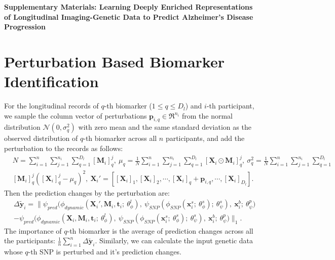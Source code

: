 \clearpage
\clearpage
\begin{center}
    \textbf{\Large Supplementary Materials: Learning Deeply Enriched Representations of Longitudinal Imaging-Genetic Data to Predict Alzheimer's Disease Progression}
\end{center}
\beginsupplement

\section{Perturbation Based Biomarker Identification}
For the longitudinal records of $q$-th biomarker ($1 \leq q \leq D_l$) and $i$-th participant, we sample the column vector of perturbations $\mathbf{p}_{i,q} \in \Re^{n_i}$ from the normal distribution $\mathcal{N}(0, \sigma_q^2)$ with zero mean and the same standard deviation as the observed distribution of $q$-th biomarker across all $n$ participants, and add the perturbation to the records as follows:
\begin{equation}
\begin{aligned}
    &N = \sum_{i=1}^n \sum_{j=1}^{n_i} \sum_{q=1}^{D_l} [\mathbf{M}_i]^j_q,\ \mu_q = \frac{1}{N}\sum_{i=1}^n \sum_{j=1}^{n_i} \sum_{q=1}^{D_l} [\mathbf{X}_i \odot \mathbf{M}_i]^j_q,\ \sigma_q^2 = \frac{1}{N}\sum_{i=1}^n \sum_{j=1}^{n_i} \sum_{q=1}^{D_l}\\
    &[\mathbf{M}_i]^j_q ([\mathbf{X}_i]^j_q - \mu_q)^2,\ \mathbf{X}_i' = [[\mathbf{X}_i]_1, [\mathbf{X}_i]_2, \cdots, [\mathbf{X}_i]_q + \mathbf{p}_{i, q}, \cdots, [\mathbf{X}_i]_{D_l}].
\end{aligned}
\end{equation}
Then the prediction changes by the perturbation are:
\begin{equation}\label{eq: neuroimaging identification}
\begin{aligned}
    &\Delta\tilde{\mathbf{y}}_i = \| \psi_{pred}\bigl(\phi_{dynamic}(\mathbf{X}_i', \mathbf{M}_i, \mathbf{t}_i;\ \theta_{\phi}^l),\ \psi_{SNP}(\phi_{SNP}(\mathbf{x}_i^s;\ \theta^s_{\phi});\ \theta^s_{\psi}),\ \mathbf{x}_i^b;\ \theta^p_{\psi}\bigr)\\
    &- \psi_{pred}\bigl(\phi_{dynamic}(\mathbf{X}_i, \mathbf{M}_i, \mathbf{t}_i;\ \theta_{\phi}^l),\ \psi_{SNP}(\phi_{SNP}(\mathbf{x}_i^s;\ \theta^s_{\phi});\ \theta^s_{\psi}),\ \mathbf{x}_i^b;\ \theta^p_{\psi}\bigr)\|_1.
\end{aligned}
\end{equation}
The importance of $q$-th biomarker is the average of prediction changes across all the participants: $\frac{1}{n}\sum_{i=1}^n\Delta\tilde{\mathbf{y}}_i$. Similarly, we can calculate the input genetic data whose $q$-th SNP is perturbed and it's prediction changes.

